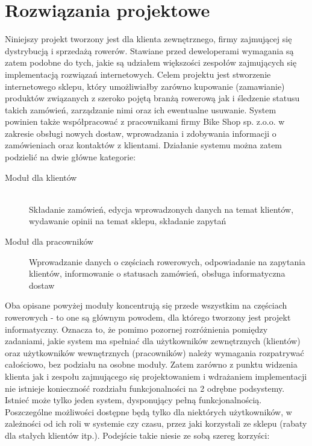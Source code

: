 \newpage
\section{Rozwiązania projektowe}

Niniejszy projekt tworzony jest dla klienta zewnętrznego, firmy zajmującej się
dystrybucją i sprzedażą rowerów. Stawiane przed deweloperami wymagania są zatem
podobne do tych, jakie są udziałem większości zespołów zajmujących się
implementacją rozwiązań internetowych. Celem projektu jest stworzenie
internetowego sklepu, który umożliwiałby zarówno kupowanie (zamawianie)
produktów związanych z szeroko pojętą branżą rowerową jak i śledzenie statusu
takich zamówień, zarządzanie nimi oraz ich ewentualne usuwanie. System powinien
także współpracować z pracownikami firmy Bike Shop sp. z.o.o. w zakresie obsługi
nowych dostaw, wprowadzania i zdobywania informacji o zamówieniach oraz kontaktów z
klientami. Działanie systemu można zatem podzielić na dwie główne kategorie:

\begin{description}
	\item[Moduł dla klientów] \hfill \\
	Składanie zamówień, edycja wprowadzonych danych na temat klientów, wydawanie
	opinii na temat sklepu, składanie zapytań
	\item[Moduł dla pracowników]
	Wprowadzanie danych o częściach rowerowych, odpowiadanie na zapytania klientów,
	informowanie o statusach zamówień, obsługa informatyczna dostaw
\end{description}

Oba opisane powyżej moduły koncentrują się przede wszystkim na częściach
rowerowych - to one są głównym powodem, dla którego tworzony jest projekt
informatyczny. Oznacza to, że pomimo pozornej rozróżnienia pomiędzy zadaniami,
jakie system ma spełniać dla użytkowników zewnętrznych (klientów) oraz
użytkowników wewnętrznych (pracowników) należy wymagania rozpatrywać całościowo,
bez podziału na osobne moduły. Zatem zarówno z punktu widzenia klienta jak i
zespołu zajmującego się projektowaniem i wdrażaniem implementacji nie istnieje
konieczność rozdziału funkcjonalności na 2 odrębne podsystemy. Istnieć może
tylko jeden system, dysponujący pełną funkcjonalnością. Poszczególne możliwości
dostępne będą tylko dla niektórych użytkowników, w zależności od ich roli w
systemie czy czasu, przez jaki korzystali ze sklepu (rabaty dla stałych
klientów itp.). Podejście takie niesie ze sobą szereg korzyści:

